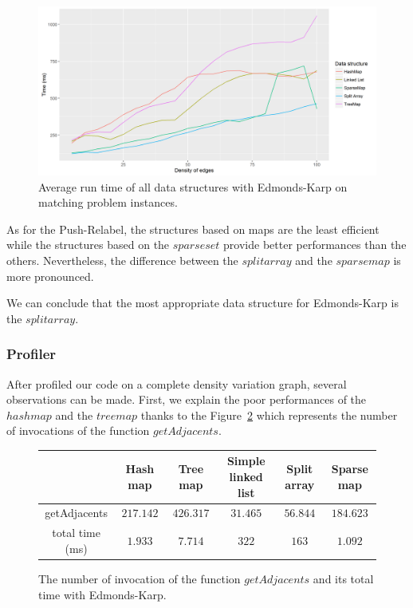 \begin{figure}[H]
\begin{center}
\includegraphics[scale=0.5]{images/results/ekmeanmatching.png}
\caption{Average run time of all data structures with Edmonds-Karp on matching problem instances.}
\label{fig:ekmeanmatching}
\end{center}
\end{figure}
As for the Push-Relabel, the structures based on maps are the least efficient while the structures based on the $sparse set$ provide better performances than the others. Nevertheless, the difference between the $split array$ and the $sparse map$ is more pronounced. 

We can conclude that the most appropriate data structure for Edmonds-Karp is the $split array$.

\subsubsection{Profiler}
After profiled our code on a complete density variation graph, several observations can be made. First, we explain the poor performances of the $hashmap$ and the $treemap$ thanks to the Figure~\ref{fig:ekadja} which represents the number of invocations of the function $getAdjacents$.

\begin{figure}[H]
\centering
\begin{tabular}{|c|c|c|c|c|c|}
	\hline
     & \textbf{Hash map} & \textbf{Tree map} & \textbf{Simple linked list} & \textbf{Split array} & \textbf{Sparse map}\\
     \hline	
   getAdjacents & $217.142$ & $426.317$ & $31.465$ & $56.844$ & $184.623$ \\
   total time (ms) & $1.933$ & $7.714$ & $322$ & $163$ & $1.092$ \\
   \hline
\end{tabular}
\caption{The number of invocation of the function $getAdjacents$ and its total time with Edmonds-Karp.}
\label{fig:ekadja} 
\end{figure}

